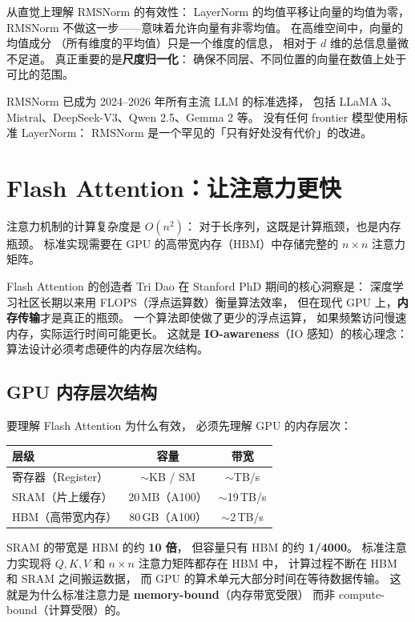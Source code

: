 从直觉上理解 RMSNorm 的有效性：
LayerNorm 的均值平移让向量的均值为零，
RMSNorm 不做这一步——意味着允许向量有非零均值。
在高维空间中，向量的均值成分
（所有维度的平均值）只是一个维度的信息，
相对于 $d$ 维的总信息量微不足道。
真正重要的是\textbf{尺度归一化}：
确保不同层、不同位置的向量在数值上处于可比的范围。

RMSNorm 已成为 2024--2026 年所有主流 LLM 的标准选择，
包括 LLaMA 3、Mistral、DeepSeek-V3、Qwen 2.5、Gemma 2 等。
没有任何 frontier 模型使用标准 LayerNorm：
RMSNorm 是一个罕见的「只有好处没有代价」的改进。

\section{Flash Attention：让注意力更快}
\label{sec:flash-attention}

注意力机制的计算复杂度是 $O(n^2)$：
对于长序列，这既是计算瓶颈，也是内存瓶颈。
标准实现需要在 GPU 的高带宽内存（HBM）中存储完整的 $n \times n$ 注意力矩阵。

Flash Attention 的创造者 Tri Dao
在 Stanford PhD 期间的核心洞察是：
深度学习社区长期以来用 FLOPS（浮点运算数）衡量算法效率，
但在现代 GPU 上，\textbf{内存传输}才是真正的瓶颈。
一个算法即使做了更少的浮点运算，
如果频繁访问慢速内存，实际运行时间可能更长。
这就是 \textbf{IO-awareness}（IO 感知）的核心理念：
算法设计必须考虑硬件的内存层次结构。

\subsection{GPU 内存层次结构}

要理解 Flash Attention 为什么有效，
必须先理解 GPU 的内存层次：

\begin{center}\small
\renewcommand{\arraystretch}{1.3}
\begin{tabular}{lcc}
\toprule
\rowcolor{figLightGray}
\textbf{层级} & \textbf{容量} & \textbf{带宽} \\
\midrule
寄存器（Register） & $\sim$KB / SM & $\sim$TB/s \\
SRAM（片上缓存） & 20\,MB（A100） & $\sim$19\,TB/s \\
HBM（高带宽内存） & 80\,GB（A100） & $\sim$2\,TB/s \\
\bottomrule
\end{tabular}
\end{center}

SRAM 的带宽是 HBM 的约 \textbf{10 倍}，
但容量只有 HBM 的约 \textbf{1/4000}。
标准注意力实现将 $Q, K, V$ 和 $n \times n$ 注意力矩阵都存在 HBM 中，
计算过程不断在 HBM 和 SRAM 之间搬运数据，
而 GPU 的算术单元大部分时间在等待数据传输。
这就是为什么标准注意力是 \textbf{memory-bound}（内存带宽受限）
而非 compute-bound（计算受限）的。

